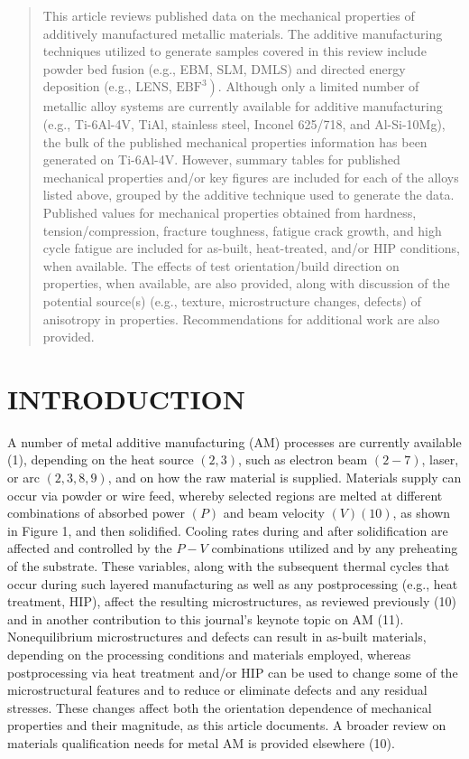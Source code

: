 \documentclass[10pt]{article}
\begin{document}
\begin{abstract}
This article reviews published data on the mechanical properties of additively manufactured metallic materials. The additive manufacturing techniques utilized to generate samples covered in this review include powder bed fusion (e.g., EBM, SLM, DMLS) and directed energy deposition (e.g., LENS, $\left.\mathrm{EBF}^{3}\right)$. Although only a limited number of metallic alloy systems are currently available for additive manufacturing (e.g., Ti-6Al-4V, TiAl, stainless steel, Inconel 625/718, and Al-Si-10Mg), the bulk of the published mechanical properties information has been generated on Ti-6Al-4V. However, summary tables for published mechanical properties and/or key figures are included for each of the alloys listed above, grouped by the additive technique used to generate the data. Published values for mechanical properties obtained from hardness, tension/compression, fracture toughness, fatigue crack growth, and high cycle fatigue are included for as-built, heat-treated, and/or HIP conditions, when available. The effects of test orientation/build direction on properties, when available, are also provided, along with discussion of the potential source(s) (e.g., texture, microstructure changes, defects) of anisotropy in properties. Recommendations for additional work are also provided.
\end{abstract}

\section*{INTRODUCTION}
A number of metal additive manufacturing (AM) processes are currently available (1), depending on the heat source $(2,3)$, such as electron beam $(2-7)$, laser, or arc $(2,3,8,9)$, and on how the raw material is supplied. Materials supply can occur via powder or wire feed, whereby selected regions are melted at different combinations of absorbed power $(P)$ and beam velocity $(V)(10)$, as shown in Figure 1, and then solidified. Cooling rates during and after solidification are affected and controlled by the $P-V$ combinations utilized and by any preheating of the substrate. These variables, along with the subsequent thermal cycles that occur during such layered manufacturing as well as any postprocessing (e.g., heat treatment, HIP), affect the resulting microstructures, as reviewed previously (10) and in another contribution to this journal's keynote topic on AM (11). Nonequilibrium microstructures and defects can result in as-built materials, depending on the processing conditions and materials employed, whereas postprocessing via heat treatment and/or HIP can be used to change some of the microstructural features and to reduce or eliminate defects and any residual stresses. These changes affect both the orientation dependence of mechanical properties and their magnitude, as this article documents. A broader review on materials qualification needs for metal AM is provided elsewhere (10).
\end{document}
